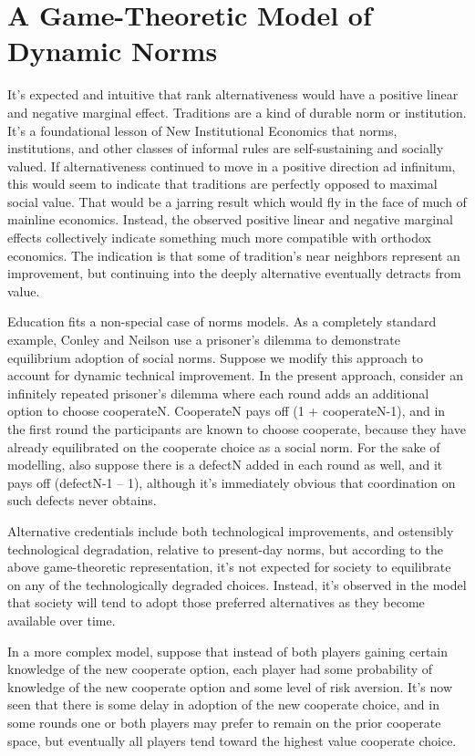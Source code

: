 \documentclass[AER]{/Users/zyl357/Documents/GitHub/research-dissertation-case-for-alt-ed/papers/alt-ed-survey/aea-latex-templates/AEA}
\begin{document}
\section{A Game-Theoretic Model of Dynamic Norms}

It’s expected and intuitive that rank alternativeness would have a
positive linear and negative marginal effect. Traditions are a kind of
durable norm or institution. It’s a foundational lesson of New
Institutional Economics that norms, institutions, and other classes of
informal rules are self-sustaining and socially valued\cite{dequech2006institutions}. If alternativeness
continued to move in a positive direction ad infinitum, this would seem to
indicate that traditions are perfectly opposed to maximal social value.
That would be a jarring result which would fly in the face of much of
mainline economics. Instead, the observed positive linear and negative
marginal effects collectively indicate something much more compatible with
orthodox economics. The indication is that some of tradition’s near
neighbors represent an improvement, but continuing into the deeply
alternative eventually detracts from value.

Education fits a non-special case of norms models. As a completely
standard example, Conley and Neilson use a prisoner’s dilemma to
demonstrate equilibrium adoption of social norms\cite{conley2009endogenous}. Suppose we modify this
approach to account for dynamic technical improvement. In the present
approach, consider an infinitely repeated prisoner’s dilemma where each
round adds an additional option to choose cooperateN. CooperateN pays off
(1 + cooperateN-1), and in the first round the participants are known to
choose cooperate, because they have already equilibrated on the cooperate
choice as a social norm. For the sake of modelling, also suppose there is
a defectN added in each round as well, and it pays off (defectN-1 – 1),
although it’s immediately obvious that coordination on such defects never
obtains.

Alternative credentials include both technological improvements, and
ostensibly technological degradation, relative to present-day norms, but
according to the above game-theoretic representation, it’s not expected
for society to equilibrate on any of the technologically degraded choices.
Instead, it’s observed in the model that society will tend to adopt those
preferred alternatives as they become available over time.

In a more complex model, suppose that instead of both players gaining
certain knowledge of the new cooperate option, each player had some
probability of knowledge of the new cooperate option and some level of
risk aversion. It’s now seen that there is some delay in adoption of the
new cooperate choice, and in some rounds one or both players may prefer to
remain on the prior cooperate space, but eventually all players tend
toward the highest value cooperate choice.
\end{document}
